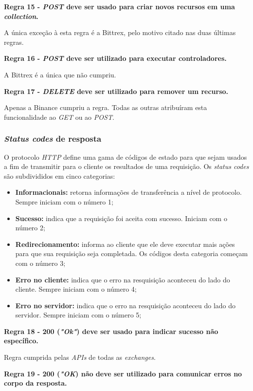 \textbf{Regra 15 - \textit{POST} deve ser usado para criar novos recursos em uma \textit{collection}.}

A única exceção à esta regra é a Bittrex, pelo motivo citado nas duas últimas regras.

\textbf{Regra 16 - \textit{POST} deve ser utilizado para executar controladores.}

A Bittrex é a única que não cumpriu.

\textbf{Regra 17 - \textit{DELETE} deve ser utilizado para remover um recurso.}

Apenas a Binance cumpriu a regra. Todas as outras atribuíram esta funcionalidade ao \textit{GET} ou ao \textit{POST}.

\subsubsection{\textit{Status codes} de resposta}

O protocolo \textit{HTTP} define uma gama de códigos de estado para que sejam usados a fim de transmitir para o cliente os resultados de uma requisição. Os \textit{status codes} são subdivididos em cinco categorias:

\begin{itemize}
    \item \textbf{Informacionais:} retorna informações de transferência a nível de protocolo. Sempre iniciam com o número 1;
    \item \textbf{Sucesso:} indica que a requisição foi aceita com sucesso. Iniciam com o número 2;
    \item \textbf{Redirecionamento:} informa ao cliente que ele deve executar mais ações para que sua requisição seja completada. Os códigos desta categoria começam com o número 3;
    \item \textbf{Erro no cliente:} indica que o erro na resquisição aconteceu do lado do cliente. Sempre iniciam com o número 4;
    \item \textbf{Erro no servidor:} indica que o erro na resquisição aconteceu do lado do servidor. Sempre iniciam com o número 5;
\end{itemize}

\textbf{Regra 18 - 200 (\textit{"Ok"}) deve ser usado para indicar sucesso não específico.}

Regra cumprida pelas \textit{APIs} de todas as \textit{exchanges}.

\textbf{Regra 19 - 200 (\textit{"OK}) não deve ser utilizado para comunicar erros no corpo da resposta.}

